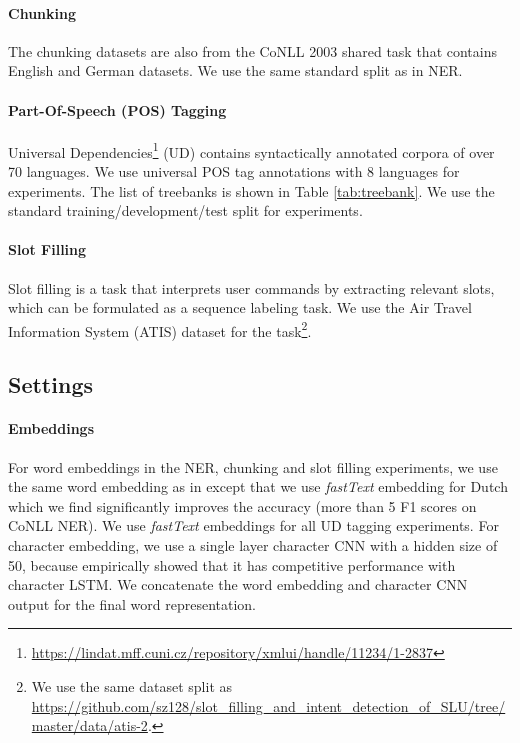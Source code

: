 \documentclass[11pt,a4paper]{article}
\begin{document}
\paragraph{Chunking} The chunking datasets are also from the CoNLL 2003 shared task \cite{tjong-kim-sang-de-meulder-2003-introduction} that contains English and German datasets. We use the same standard split as in NER.
\paragraph{Part-Of-Speech (POS) Tagging} Universal Dependencies\footnote{\url{https://lindat.mff.cuni.cz/repository/xmlui/handle/11234/1-2837}} (UD) \cite{11234/1-2837} contains syntactically annotated corpora of over 70 languages. We use universal POS tag annotations with 8 languages for experiments. The list of treebanks is shown in Table \ref{tab:treebank}. We use the standard training/development/test split for experiments.
\paragraph{Slot Filling} Slot filling is a task that interprets user commands by extracting relevant slots, which can be formulated as a sequence labeling task. We use the Air Travel Information System (ATIS) \cite{hemphill-etal-1990-atis} dataset for the task\footnote{We use the same dataset split as \url{https://github.com/sz128/slot_filling_and_intent_detection_of_SLU/tree/master/data/atis-2}.}.


\subsection{Settings}
\paragraph{Embeddings} For word embeddings in the NER, chunking and slot filling experiments, we use the same word embedding as in \citet{lample-etal-2016-neural} except that we use \textit{fastText} \cite{bojanowski2017enriching} embedding for Dutch which we find significantly improves the accuracy (more than 5 F1 scores on CoNLL NER). We use \textit{fastText} embeddings for all UD tagging experiments. For character embedding, we use a single layer character CNN with a hidden size of 50, because \citet{yang-etal-2018-design} empirically showed that it has competitive performance with character LSTM. We concatenate the word embedding and character CNN output for the final word representation.
\end{document}
